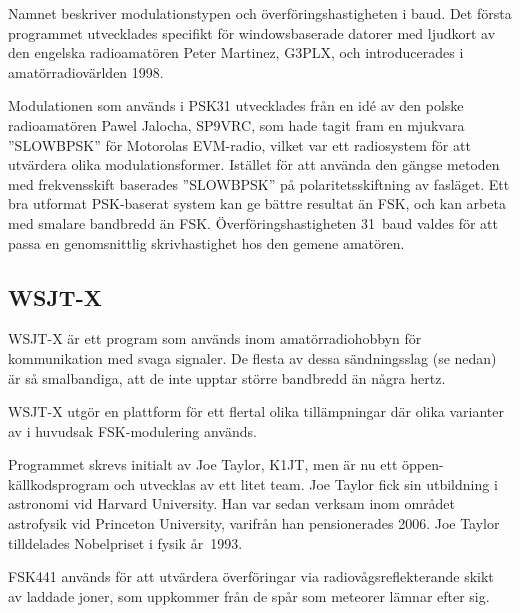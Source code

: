 \begin{historiabox}
Namnet beskriver modulationstypen och överföringshastigheten i baud.
Det första programmet utvecklades specifikt för windowsbaserade datorer med
ljudkort av den engelska radioamatören Peter Martinez, G3PLX, och
introducerades i amatörradiovärlden 1998.
\end{historiabox}

Modulationen som används i PSK31 utvecklades från en idé av den polske
radioamatören Pawel Jalocha, SP9VRC, som hade tagit fram en mjukvara
''SLOWBPSK'' för Motorolas EVM-radio, vilket var ett radiosystem för att
utvärdera olika modulationsformer.
Istället för att använda den gängse metoden med frekvensskift baserades
''SLOWBPSK'' på polaritetsskiftning av fasläget.
Ett bra utformat PSK-baserat system kan ge bättre resultat än FSK, och kan
arbeta med smalare bandbredd än FSK.
Överföringshastigheten 31~baud valdes för att passa en genomsnittlig
skrivhastighet hos den gemene amatören.

\subsection{WSJT-X}

WSJT-X är ett program som används inom amatörradiohobbyn för kommunikation med
svaga signaler.
De flesta av dessa sändningsslag (se nedan) är så smalbandiga, att de inte
upptar större bandbredd än några hertz.

WSJT-X utgör en plattform för ett flertal olika tillämpningar där olika
varianter av i huvudsak FSK-modulering används.

\begin{historiabox}
Programmet skrevs initialt av Joe Taylor, K1JT, men är nu ett
öppen-källkodsprogram och utvecklas av ett litet team.
Joe Taylor fick sin utbildning i astronomi vid Harvard University.
Han var sedan verksam inom området astrofysik vid Princeton University,
varifrån han pensionerades 2006.
Joe Taylor tilldelades Nobelpriset i fysik år~1993.
\end{historiabox}

FSK441 används för att utvärdera överföringar via radiovågsreflekterande skikt
av laddade joner, som uppkommer från de spår som meteorer lämnar efter sig.

